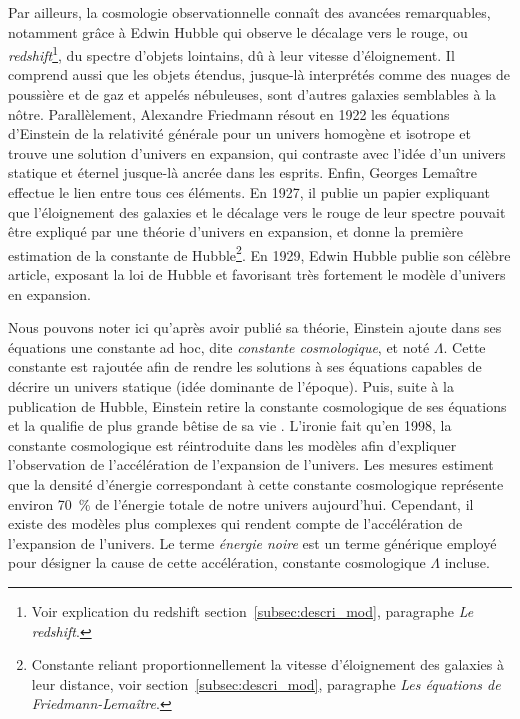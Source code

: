 Par ailleurs, la cosmologie observationnelle connaît des avancées remarquables, notamment grâce à Edwin Hubble qui observe le décalage vers le rouge, ou \emph{redshift}\footnote{Voir explication du redshift section~\ref{subsec:descri_mod}, paragraphe \emph{Le redshift}.}, du spectre d'objets lointains, dû à leur vitesse d'éloignement. Il comprend aussi que les objets étendus, jusque-là interprétés comme des nuages de poussière et de gaz et appelés nébuleuses, sont d'autres galaxies semblables à la nôtre. Parallèlement, Alexandre Friedmann résout en 1922 les équations d'Einstein de la relativité générale pour un univers homogène et isotrope et trouve une solution d'univers en expansion, qui contraste avec l'idée d'un univers statique et éternel jusque-là ancrée dans les esprits. Enfin, Georges Lemaître effectue le lien entre tous ces éléments. En 1927, il publie un papier expliquant que l'éloignement des galaxies et le décalage vers le rouge de leur spectre pouvait être expliqué par une théorie d'univers en expansion, et donne la première estimation de la constante de Hubble\footnote{Constante reliant proportionnellement la vitesse d'éloignement des galaxies à leur distance, voir section~\ref{subsec:descri_mod}, paragraphe \emph{Les équations de Friedmann-Lemaître}.}. En 1929, Edwin Hubble publie son célèbre article, exposant la loi de Hubble et favorisant très fortement le modèle d'univers en expansion.

Nous pouvons noter ici qu'après avoir publié sa théorie, Einstein ajoute dans ses équations une constante ad hoc, dite \emph{constante cosmologique}, et noté $\Lambda$. Cette constante est rajoutée afin de rendre les solutions à ses équations capables de décrire un univers statique (idée dominante de l'époque). Puis, suite à la publication de Hubble, Einstein retire la constante cosmologique de ses équations et la qualifie de \og plus grande bêtise de sa vie \fg. L'ironie fait qu'en 1998, la constante cosmologique est réintroduite dans les modèles afin d'expliquer l'observation de l'accélération de l'expansion de l'univers. Les mesures estiment que la densité d'énergie correspondant à cette constante cosmologique représente environ \SI{70}{\percent} de l'énergie totale de notre univers aujourd'hui. Cependant, il existe des modèles plus complexes qui rendent compte de l'accélération de l'expansion de l'univers. Le terme \emph{énergie noire} est un terme générique employé pour désigner la cause de cette accélération, constante cosmologique $\Lambda$ incluse.

